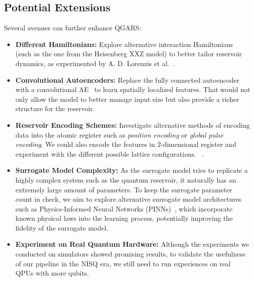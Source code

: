 \documentclass[conference]{IEEEtran}
\begin{document}
\subsection{Potential Extensions}
Several avenues can further enhance QGARS:
\begin{itemize}
    \item \textbf{Different Hamiltonians:}
    Explore alternative interaction Hamiltonians (such as the one from the Heisenberg XXZ model) to better tailor reservoir dynamics, as experimented by A. D. Lorenzis et al.~\cite{lorenzisHarnessingQuantumExtreme2025}.

    \item \textbf{Convolutional Autoencoders:}
    Replace the fully connected autoencoder with a convolutional AE~\cite{lerchConvolutionalAutoencodersSpatiallyinformed2022} to learn spatially localized features. That would not only allow the model to better manage input size but also provide a richer structure for the reservoir.
    
    \item \textbf{Reservoir Encoding Schemes:}
    Investigate alternative methods of encoding data into the atomic register such as \textit{position encoding} or \textit{global pulse encoding}. We could also encode the features in $2$-dimensional register and experiment with the different possible lattice configurations. ~\cite{kornjavcaLargescaleQuantumReservoir2024}.

    \item \textbf{Surrogate Model Complexity:}
    As the surrogate model tries to replicate a highly complex system such as the quantum reservoir, it naturally has an extremely large amount of parameters. To keep the surrogate parameter count in check, we aim to explore alternative surrogate model architectures such as Physics-Informed Neural Networks (PINNs)~\cite{raissiPhysicsInformedDeep2017}, which incorporate known physical laws into the learning process, potentially improving the fidelity of the surrogate model.

    \item \textbf{Experiment on Real Quantum Hardware:}
    Although the experiments we conducted on simulators showed promising results, to validate the usefulness of our pipeline in the NISQ era, we still need to run experiences on real QPUs with more qubits. 


\end{itemize}

\end{document}
